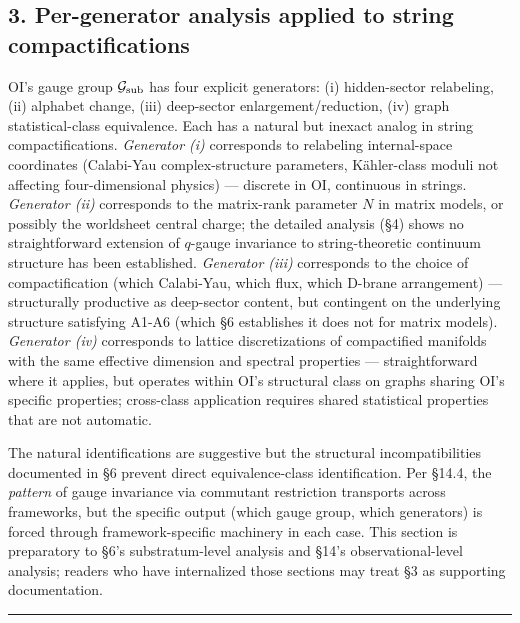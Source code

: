 \documentclass[
]{article}
\begin{document}
\hypertarget{per-generator-analysis-applied-to-string-compactifications}{%
\subsection{3. Per-generator analysis applied to string
compactifications}\label{per-generator-analysis-applied-to-string-compactifications}}

OI's gauge group \(\mathcal{G}_{\rm sub}\) has four explicit generators:
(i) hidden-sector relabeling, (ii) alphabet change, (iii) deep-sector
enlargement/reduction, (iv) graph statistical-class equivalence. Each
has a natural but inexact analog in string compactifications.
\emph{Generator (i)} corresponds to relabeling internal-space
coordinates (Calabi-Yau complex-structure parameters, Kähler-class
moduli not affecting four-dimensional physics) --- discrete in OI,
continuous in strings. \emph{Generator (ii)} corresponds to the
matrix-rank parameter \(N\) in matrix models, or possibly the worldsheet
central charge; the detailed analysis (§4) shows no straightforward
extension of \(q\)-gauge invariance to string-theoretic continuum
structure has been established. \emph{Generator (iii)} corresponds to
the choice of compactification (which Calabi-Yau, which flux, which
D-brane arrangement) --- structurally productive as deep-sector content,
but contingent on the underlying structure satisfying A1-A6 (which §6
establishes it does not for matrix models). \emph{Generator (iv)}
corresponds to lattice discretizations of compactified manifolds with
the same effective dimension and spectral properties --- straightforward
where it applies, but operates within OI's structural class on graphs
sharing OI's specific properties; cross-class application requires
shared statistical properties that are not automatic.

The natural identifications are suggestive but the structural
incompatibilities documented in §6 prevent direct equivalence-class
identification. Per §14.4, the \emph{pattern} of gauge invariance via
commutant restriction transports across frameworks, but the specific
output (which gauge group, which generators) is forced through
framework-specific machinery in each case. This section is preparatory
to §6's substratum-level analysis and §14's observational-level
analysis; readers who have internalized those sections may treat §3 as
supporting documentation.

\begin{center}\rule{0.5\linewidth}{0.5pt}\end{center}
\end{document}
